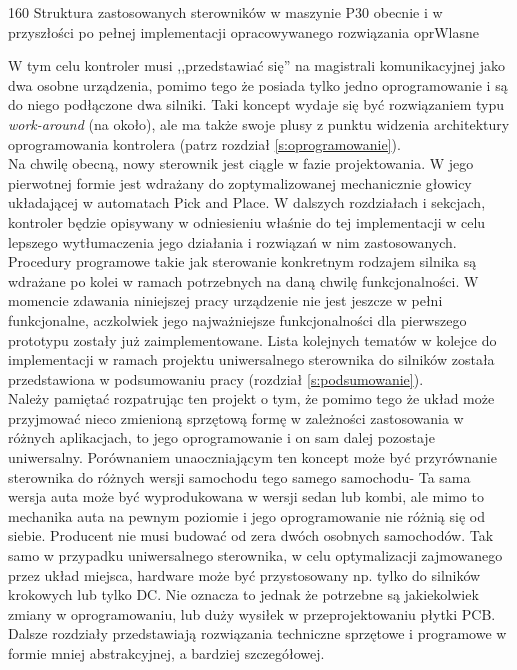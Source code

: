	{160}
	{Struktura zastosowanych sterowników w maszynie P30 obecnie i w przyszłości po pełnej implementacji opracowywanego rozwiązania}
	{oprWlasne}

W tym celu kontroler musi ,,przedstawiać się'' na magistrali komunikacyjnej jako dwa osobne urządzenia, pomimo tego że posiada tylko jedno oprogramowanie i są do niego podłączone dwa silniki. Taki koncept wydaje się być rozwiązaniem typu {\it work-around} (na około), ale ma także swoje plusy z punktu widzenia architektury oprogramowania kontrolera (patrz rozdział \ref{s:oprogramowanie}). \\

Na chwilę obecną, nowy sterownik jest ciągle w fazie projektowania. W jego pierwotnej formie jest wdrażany do zoptymalizowanej mechanicznie głowicy układającej w automatach Pick and Place. W dalszych rozdziałach i sekcjach, kontroler będzie opisywany w odniesieniu właśnie do tej implementacji w celu lepszego wytłumaczenia jego działania i rozwiązań w nim zastosowanych. Procedury programowe takie jak sterowanie konkretnym rodzajem silnika są wdrażane po kolei w ramach potrzebnych na daną chwilę funkcjonalności. W momencie zdawania niniejszej pracy urządzenie nie jest jeszcze w pełni funkcjonalne, aczkolwiek jego najważniejsze funkcjonalności dla pierwszego prototypu zostały już zaimplementowane. Lista kolejnych tematów w kolejce do implementacji w ramach projektu uniwersalnego sterownika do silników została przedstawiona w podsumowaniu pracy (rozdział \ref{s:podsumowanie}). \\

Należy pamiętać rozpatrując ten projekt o tym, że pomimo tego że układ może przyjmować nieco zmienioną sprzętową formę w zależności zastosowania w różnych aplikacjach, to jego oprogramowanie i on sam dalej pozostaje uniwersalny. Porównaniem unaoczniającym ten koncept może być przyrównanie sterownika do różnych wersji samochodu tego samego samochodu- Ta sama wersja auta może być wyprodukowana w wersji sedan lub kombi, ale mimo to mechanika auta na pewnym poziomie i jego oprogramowanie nie różnią się od siebie. Producent nie musi budować od zera dwóch osobnych samochodów. Tak samo w przypadku uniwersalnego sterownika, w celu optymalizacji zajmowanego przez układ miejsca, hardware może być przystosowany np. tylko do silników krokowych lub tylko DC. Nie oznacza to jednak że potrzebne są jakiekolwiek zmiany w oprogramowaniu, lub duży wysiłek w przeprojektowaniu płytki PCB. \\

Dalsze rozdziały przedstawiają rozwiązania techniczne sprzętowe i programowe w formie mniej abstrakcyjnej, a bardziej szczegółowej.

\clearpage



